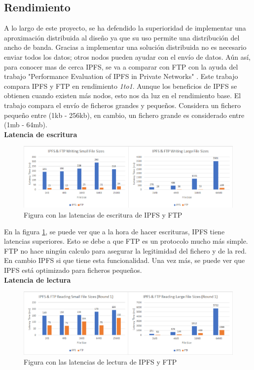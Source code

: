 \subsection{Rendimiento}
A lo largo de este proyecto, se ha defendido la superioridad de implementar una aproximación distribuida al diseño ya que su uso permite una distribución del ancho de banda. Gracias a implementar una solución distribuida no es necesario enviar todos los datos; otros nodos pueden ayudar con el envío de datos. Aún así, para conocer mas de cerca IPFS, se va a comparar con FTP con la ayuda del trabajo "Performance Evaluation of IPFS in Private Networks" \cite{web:perf}. Este trabajo compara IPFS y FTP \cite{web:ftp} en rendimiento \textit{1to1}. Aunque los beneficios de IPFS se obtienen cuando existen más nodos, esto nos da luz en el rendimiento base. El trabajo compara el envío de ficheros grandes y pequeños. Considera un fichero pequeño entre (1kb - 256kb), en cambio, un fichero grande es considerado entre (1mb - 64mb).\\
\textbf{Latencia de escritura}\\
\begin{figure}[h!]
    \centering
    \includegraphics[width=1\textwidth]{Figures/4-Figure1-1.png}
    \caption{Figura con las latencias de escritura de IPFS y FTP}
    \label{fg:fig1}
\end{figure}
En la figura \ref{fg:fig1}, se puede ver que a la hora de hacer escrituras, IPFS tiene latencias superiores. Esto se debe a que FTP es un protocolo mucho más simple. FTP no hace ningún calculo para asegurar la legitimidad del fichero y de la red. En cambio IPFS si que tiene esta funcionalidad. Una vez más, se puede ver que IPFS está optimizado para ficheros pequeños.\\
\textbf{Latencia de lectura}\\
\begin{figure}
    \centering
    \includegraphics[width=1\textwidth]{Figures/4-Figure3-1.png}
    \caption{Figura con las latencias de lectura de IPFS y FTP}
    \label{fg:fig2}
\end{figure}
